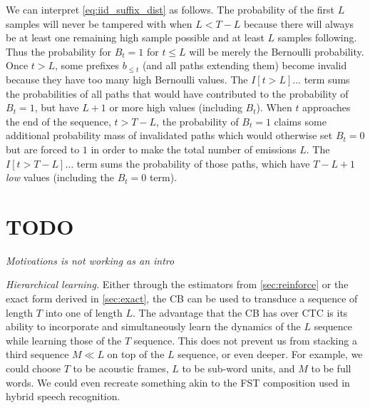 \documentclass{article}
\begin{document}
We can interpret \cref{eq:iid_suffix_dist} as follows. The probability of the
first $L$ samples will never be tampered with when $L < T - L$ because there
will always be at least one remaining high sample possible and at least $L$
samples following. Thus the probability for $B_t = 1$ for $t \leq L$ will be
merely the Bernoulli probability. Once $t > L$, some prefixes $b_{\leq t}$ (and
all paths extending them) become invalid because they have too many high
Bernoulli values. The $I[t > L]\ldots$ term sums the probabilities of all paths
that would have contributed to the probability of $B_t=1$, but have $L + 1$ or
more high values (including $B_t$). When $t$ approaches the end of the
sequence, $t > T - L$, the probability of $B_t=1$ claims some additional
probability mass of invalidated paths which would otherwise set $B_t=0$ but are
forced to $1$ in order to make the total number of emissions $L$. The $I[t > T
- L]\ldots$ term sums the probability of those paths, which have $T - L + 1$
\emph{low} values (including the $B_t=0$ term).

\section{TODO}

\emph{Motivations is not working as an intro}

\emph{Hierarchical learning.} Either through the estimators from
\cref{sec:reinforce} or the exact form derived in \cref{sec:exact}, the CB can
be used to transduce a sequence of length $T$ into one of length $L$. The
advantage that the CB has over CTC is its ability to incorporate and
simultaneously learn the dynamics of the $L$ sequence while learning those of
the $T$ sequence. This does not prevent us from stacking a third sequence
$M \ll L$ on top of the $L$ sequence, or even deeper. For example, we could
choose $T$ to be acoustic frames, $L$ to be sub-word units, and $M$ to be full
words. We could even recreate something akin to the FST composition used in
hybrid speech recognition.

\end{document}
